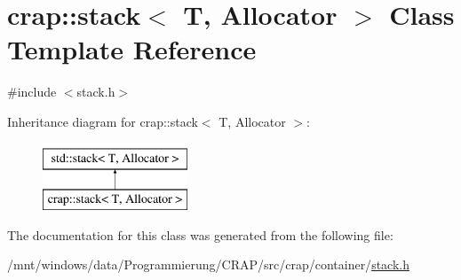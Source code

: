 \hypertarget{classcrap_1_1stack}{\section{crap\-:\-:stack$<$ T, Allocator $>$ Class Template Reference}
\label{classcrap_1_1stack}
}


{\ttfamily \#include $<$stack.\-h$>$}

Inheritance diagram for crap\-:\-:stack$<$ T, Allocator $>$\-:\begin{figure}[H]
\begin{center}
\leavevmode
\includegraphics[height=2.000000cm]{classcrap_1_1stack}
\end{center}
\end{figure}


The documentation for this class was generated from the following file\-:\begin{DoxyCompactItemize}
\item 
/mnt/windows/data/\-Programmierung/\-C\-R\-A\-P/src/crap/container/\hyperlink{stack_8h}{stack.\-h}\end{DoxyCompactItemize}
